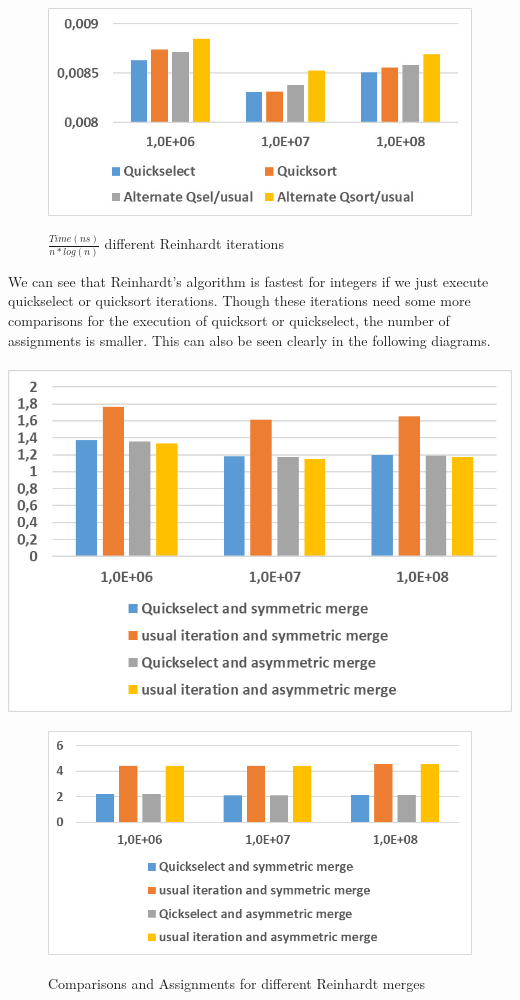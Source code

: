 \documentclass[11pt,pdftex,a4paper, twocolumn]{article}
\begin{document}
\begin{figure}[H]
\includegraphics[width=\linewidth]{Diagramm-Bilder/diff-iterations-time.JPG} \\
\caption{ $ \frac{Time(ns)}{n*log(n)} $ different Reinhardt iterations } \label{fig:diff-iterations-time}
\end{figure}
We can see that Reinhardt’s algorithm is fastest for integers if we just execute quickselect or quicksort iterations. Though these iterations need some more comparisons for the execution of quicksort or quickselect, the number of assignments is smaller. This can also be seen clearly in the following diagrams. \\
$ $ \\
\includegraphics[width=\linewidth]{Diagramm-Bilder/diff-iterationsAndMerges-comparisons.JPG}
\begin{figure}[H]
\includegraphics[width=\linewidth]{Diagramm-Bilder/diff-iterationsAndMerges-assignments.JPG} \\
\caption{Comparisons and Assignments for different Reinhardt merges} \label{fig:diff-iterationsAndMerges-assignAndComp}
\end{figure}
\end{document}
